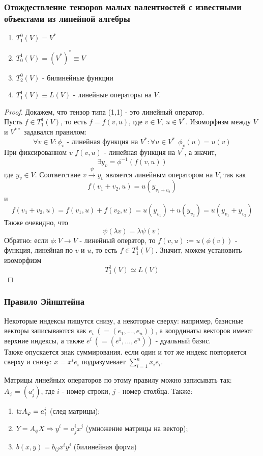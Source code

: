 \subsubsection*{Отождествление тензоров малых валентностей с известными объектами из линейной алгебры}
\begin{theorem}\tab
    \begin{enumerate}
        \item $T_1^0(V)=V^*$
        \item $T_0^1(V)=(V^*)^* \equiv V$
        \item $T_2^0(V)$ - билинейные функции
        \item $T_1^1(V) \equiv L(V)$ - линейные операторы на $V$.
    \end{enumerate}
\end{theorem} 
\begin{proof}
    Докажем, что тензор типа (1,1) - это линейный оператор.\\
    Пусть $f\in T_1^1(V)$, то есть $f=f(v,u)$, где $v\in V,\ u\in V^*$. Изоморфизм между $V$ и $V^{**}$ задавался правилом:
    \[ \forall v\in V: \phi_v \text{ - линейная функция на } V^*: \forall u\in V^*\ \ \phi_v(u)=u(v)\]
    При фиксированном $v$ $f(v,u)$ - линейная функция на $V^*$, а значит,
    \[\exists y_v = \phi^{-1}(f(v, u))\]
    где $y_v\in V$. Соответствие $v\xrightarrow{\psi} y_v$ является линейным оператором на $V$, так как 
    \[f(v_1+v_2,u)=u(y_{v_1+v_2})\]
    и 
    \[f(v_1+v_2,u)=f(v_1,u)+f(v_2,u)=u(y_{v_1})+u(y_{v_2})=u(y_{v_1}+y_{v_2})\]
    Также очевидно, что 
    \[\psi(\lambda v)=\lambda\psi(v)\]
    Обратно: если $\phi: V\to V$ - линейный оператор, то $f(v,u):=u(\phi(v))$ - функция, линейная по $v$ и $u$, то есть $f\in T^1_1(V)$. Значит, можем установить изоморфизм
    \[T_1^1(V)\simeq L(V)\]
\end{proof}  
\subsubsection*{Правило Эйнштейна}
Некоторые индексы пишутся снизу, а некоторые сверху: например, базисные векторы записываются как $e_i \ (= (e_1,...,e_n))$, а координаты векторов имеют верхние индексы, а также $e^i \ (=(e^1,...,e^n))$ - дуальный базис.\\
Также опускается знак суммирования. если один и тот же индекс повторяется сверху и снизу: $x = x^ie_i$ подразумевает $\sum \limits_{i=1}^n x_ie_i$.

Матрицы линейных операторов по этому правилу можно записывать так: $A_\phi = (a_j^i)$, где $i$ - номер строки, $j$ - номер столбца. Также:
\begin{enumerate}
    \item $\textup{tr} A_\phi = a_i^i$ (след матрицы);
    \item $Y = A_\phi X \Longrightarrow y^i = a_j^ix^j$ (умножение матрицы на вектор);
    \item $b(x, y) = b_{ij}x^iy^j$ (билинейная форма)
\end{enumerate}

